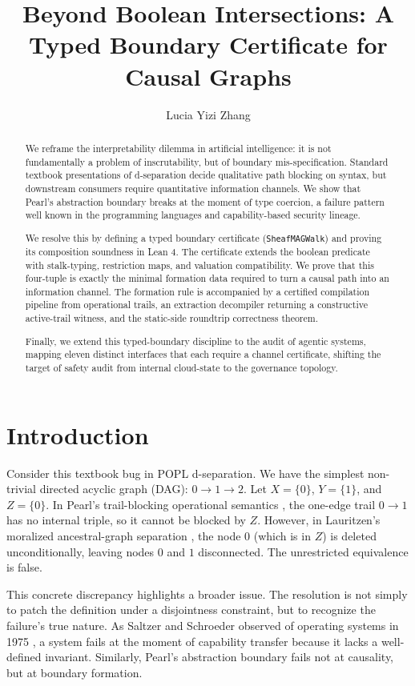 \documentclass[acmsmall,screen,nonacm]{acmart}
\title{Beyond Boolean Intersections: A Typed Boundary Certificate for Causal Graphs}
\author{Lucia Yizi Zhang}
\affiliation{%
  \institution{Shanghai Lixin University of Accounting and Finance}
  \country{China}
}
\newcommand{\lean}[1]{\lstinline!#1!}
\begin{document}
\begin{abstract}
We reframe the interpretability dilemma in artificial intelligence: it is not fundamentally a problem of inscrutability, but of boundary mis-specification. Standard textbook presentations of d-separation decide qualitative path blocking on syntax, but downstream consumers require quantitative information channels. We show that Pearl's abstraction boundary breaks at the moment of type coercion, a failure pattern well known in the programming languages and capability-based security lineage.

We resolve this by defining a typed boundary certificate (\lean{SheafMAGWalk}) and proving its composition soundness in Lean 4. The certificate extends the boolean predicate with stalk-typing, restriction maps, and valuation compatibility. We prove that this four-tuple is exactly the minimal formation data required to turn a causal path into an information channel. The formation rule is accompanied by a certified compilation pipeline from operational trails, an extraction decompiler returning a constructive active-trail witness, and the static-side roundtrip correctness theorem.

Finally, we extend this typed-boundary discipline to the audit of agentic systems, mapping eleven distinct interfaces that each require a channel certificate, shifting the target of safety audit from internal cloud-state to the governance topology.
\end{abstract}
\maketitle

\section{Introduction}\label{sec:intro}

Consider this textbook bug in POPL d-separation. We have the simplest non-trivial directed acyclic graph (DAG): $0 \to 1 \to 2$. Let $X = \{0\}$, $Y = \{1\}$, and $Z = \{0\}$. In Pearl's trail-blocking operational semantics \cite{pearl2009causality}, the one-edge trail $0 \to 1$ has no internal triple, so it cannot be blocked by $Z$. However, in Lauritzen's moralized ancestral-graph separation \cite{lauritzen1996graphical}, the node $0$ (which is in $Z$) is deleted unconditionally, leaving nodes $0$ and $1$ disconnected. The unrestricted equivalence is false.

This concrete discrepancy highlights a broader issue. The resolution is not simply to patch the definition under a disjointness constraint, but to recognize the failure's true nature. As Saltzer and Schroeder observed of operating systems in 1975 \cite{saltzer1975protection}, a system fails at the moment of capability transfer because it lacks a well-defined invariant. Similarly, Pearl's abstraction boundary fails not at causality, but at boundary formation.
\end{document}
